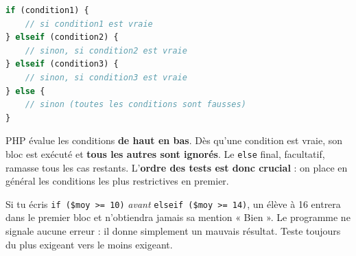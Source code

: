 \documentclass[11pt]{article}
\begin{document}
\begin{propriete}
\begin{lstlisting}[language=Php]
if (condition1) {
    // si condition1 est vraie
} elseif (condition2) {
    // sinon, si condition2 est vraie
} elseif (condition3) {
    // sinon, si condition3 est vraie
} else {
    // sinon (toutes les conditions sont fausses)
}
\end{lstlisting}
PHP évalue les conditions \textbf{de haut en bas}. Dès qu'une condition est vraie, son bloc est exécuté et \textbf{tous les autres sont ignorés}. Le \texttt{else} final, facultatif, ramasse tous les cas restants. L'\textbf{ordre des tests est donc crucial} : on place en général les conditions les plus restrictives en premier.
\end{propriete}

\begin{attention}
Si tu écris \texttt{if (\$moy >= 10)} \emph{avant} \texttt{elseif (\$moy >= 14)}, un élève à 16 entrera dans le premier bloc et n'obtiendra jamais sa mention « Bien ». Le programme ne signale aucune erreur : il donne simplement un mauvais résultat. Teste toujours du plus exigeant vers le moins exigeant.
\end{attention}
\end{document}
